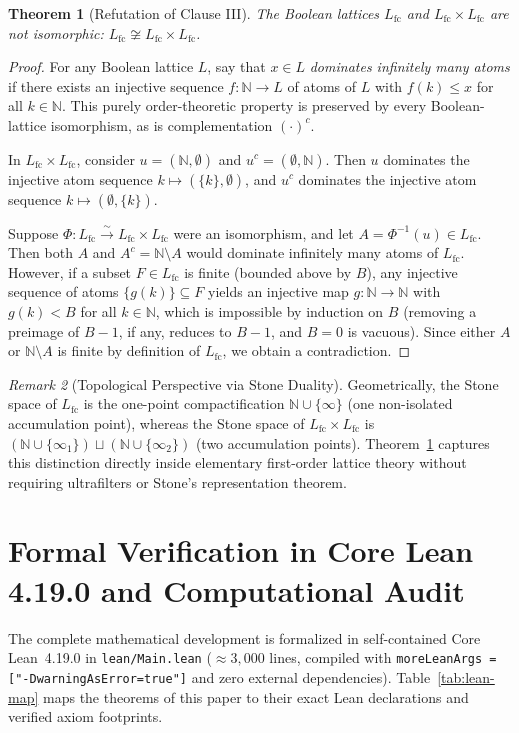 \documentclass[11pt]{article}
\newtheorem{theorem}{Theorem}[section]
\theoremstyle{definition}
\theoremstyle{remark}
\newtheorem{remark}[theorem]{Remark}
\newcommand{\N}{\mathbb{N}}
\newcommand{\Lfc}{L_{\mathrm{fc}}}
\begin{document}
\begin{theorem}[Refutation of Clause III]
\label{thm:clause3-false}
The Boolean lattices $\Lfc$ and $\Lfc \times \Lfc$ are \emph{not} isomorphic: $\Lfc \not\cong \Lfc \times \Lfc$.
\end{theorem}
\begin{proof}
For any Boolean lattice $L$, say that $x \in L$ \emph{dominates infinitely many atoms} if there exists an injective sequence $f : \N \to L$ of atoms of $L$ with $f(k) \le x$ for all $k \in \N$. This purely order-theoretic property is preserved by every Boolean-lattice isomorphism, as is complementation $(\cdot)^c$.

In $\Lfc \times \Lfc$, consider $u = (\N, \emptyset)$ and $u^c = (\emptyset, \N)$. Then $u$ dominates the injective atom sequence $k \mapsto (\{k\}, \emptyset)$, and $u^c$ dominates the injective atom sequence $k \mapsto (\emptyset, \{k\})$.

Suppose $\Phi : \Lfc \xrightarrow{\sim} \Lfc \times \Lfc$ were an isomorphism, and let $A = \Phi^{-1}(u) \in \Lfc$. Then both $A$ and $A^c = \N \setminus A$ would dominate infinitely many atoms of $\Lfc$. However, if a subset $F \in \Lfc$ is finite (bounded above by $B$), any injective sequence of atoms $\{g(k)\} \subseteq F$ yields an injective map $g : \N \to \N$ with $g(k) < B$ for all $k \in \N$, which is impossible by induction on $B$ (removing a preimage of $B-1$, if any, reduces to $B-1$, and $B = 0$ is vacuous). Since either $A$ or $\N \setminus A$ is finite by definition of $\Lfc$, we obtain a contradiction.
\end{proof}

\begin{remark}[Topological Perspective via Stone Duality]
Geometrically, the Stone space of $\Lfc$ is the one-point compactification $\N \cup \{\infty\}$ (one non-isolated accumulation point), whereas the Stone space of $\Lfc \times \Lfc$ is $(\N \cup \{\infty_1\}) \sqcup (\N \cup \{\infty_2\})$ (two accumulation points). Theorem~\ref{thm:clause3-false} captures this distinction directly inside elementary first-order lattice theory without requiring ultrafilters or Stone's representation theorem.
\end{remark}

\section{Formal Verification in Core Lean 4.19.0 and Computational Audit}

The complete mathematical development is formalized in self-contained Core Lean~4.19.0 in \texttt{lean/Main.lean} ($\approx 3{,}000$ lines, compiled with \texttt{moreLeanArgs = ["-DwarningAsError=true"]} and zero external dependencies). Table~\ref{tab:lean-map} maps the theorems of this paper to their exact Lean declarations and verified axiom footprints.
\end{document}
